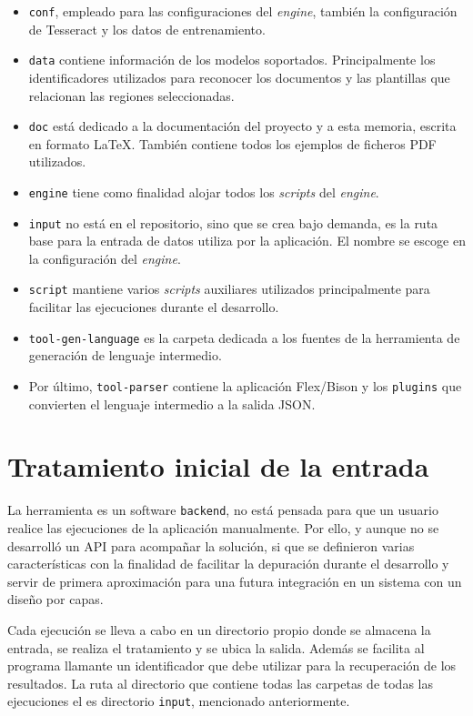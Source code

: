 \begin{itemize}
    \item \verb|conf|, empleado para las configuraciones del \emph{engine}, también la configuración de Tesseract y los datos de entrenamiento.
    \item \verb|data| contiene información de los modelos soportados. Principalmente los identificadores utilizados para reconocer los documentos y las plantillas que relacionan las regiones seleccionadas.
    \item \verb|doc| está dedicado a la documentación del proyecto y a esta memoria, escrita en formato \LaTeX. También contiene todos los ejemplos de ficheros PDF utilizados.
    \item \verb|engine| tiene como finalidad alojar todos los \emph{scripts} del \emph{engine}.
    \item \verb|input| no está en el repositorio, sino que se crea bajo demanda, es la ruta base para la entrada de datos utiliza por la aplicación. El nombre se escoge en la configuración del \emph{engine}.
    \item \verb|script| mantiene varios \emph{scripts} auxiliares utilizados principalmente para facilitar las ejecuciones durante el desarrollo.
    \item \verb|tool-gen-language| es la carpeta dedicada a los fuentes de la herramienta de generación de lenguaje intermedio.
    \item Por último, \verb|tool-parser| contiene la aplicación Flex/Bison y los \verb|plugins| que convierten el lenguaje intermedio a la salida JSON.
\end{itemize}

\section{Tratamiento inicial de la entrada}

La herramienta es un software \verb|backend|, no está pensada para que un usuario realice las ejecuciones de la aplicación manualmente. Por ello, y aunque no se desarrolló un API para acompañar la solución, si que se definieron varias características con la finalidad de facilitar la depuración durante el desarrollo y servir de primera aproximación para una futura integración en un sistema con un diseño por capas.

Cada ejecución se lleva a cabo en un directorio propio donde se almacena la entrada, se realiza el tratamiento y se ubica la salida. Además se facilita al programa llamante un identificador que debe utilizar para la recuperación de los resultados. La ruta al directorio que contiene todas las carpetas de todas las ejecuciones el es directorio \verb|input|, mencionado anteriormente.

